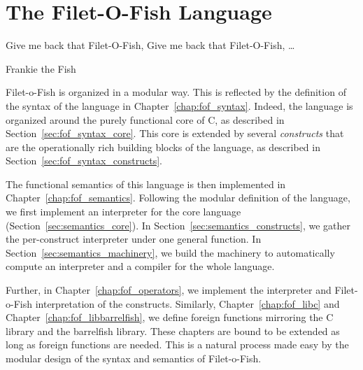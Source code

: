 \chapter*{The Filet-O-Fish Language}
\label{chap:fof_lang}
\epigraph{Give me back that Filet-O-Fish, Give me back that Filet-O-Fish, \ldots}%
         {Frankie the Fish}



Filet-o-Fish is organized in a modular way. This is reflected by the
definition of the syntax of the language in
Chapter~\ref{chap:fof_syntax}. Indeed, the language is organized
around the purely functional core of C, as described in
Section~\ref{sec:fof_syntax_core}. This core is extended by several
\emph{constructs} that are the operationally rich building blocks of
the language, as described in Section~\ref{sec:fof_syntax_constructs}.


The functional semantics of this language is then implemented in
Chapter~\ref{chap:fof_semantics}. Following the modular definition of
the language, we first implement an interpreter for the core language
(Section~\ref{sec:semantics_core}). In
Section~\ref{sec:semantics_constructs}, we gather the per-construct
interpreter under one general function. In
Section~\ref{sec:semantics_machinery}, we build the machinery to
automatically compute an interpreter and a compiler for the whole
language.

Further, in Chapter~\ref{chap:fof_operators}, we implement the
interpreter and Filet-o-Fish interpretation of the
constructs. Similarly, Chapter~\ref{chap:fof_libc} and
Chapter~\ref{chap:fof_libbarrelfish}, we define foreign functions
mirroring the C library and the barrelfish library. These chapters are
bound to be extended as long as foreign functions are needed. This is
a natural process made easy by the modular design of the syntax and
semantics of Filet-o-Fish.
